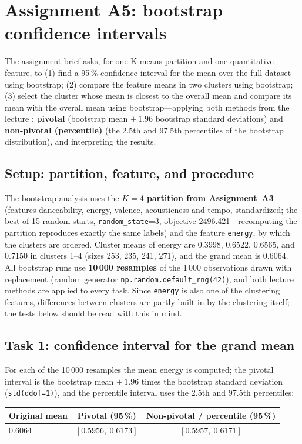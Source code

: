 \documentclass[11pt,letterpaper]{article}
\begin{document}
\section{Assignment A5: bootstrap confidence intervals}\label{sec:a5}

The assignment brief asks, for one K-means partition and one quantitative
feature, to (1) find a 95\,\% confidence interval for the mean over the full
dataset using bootstrap; (2) compare the feature means in two clusters using
bootstrap; (3) select the cluster whose mean is closest to the overall mean
and compare its mean with the overall mean using bootstrap---applying both
methods from the lecture \citep{efron,course}: \textbf{pivotal} (bootstrap
mean $\pm\,1.96$ bootstrap standard deviations) and \textbf{non-pivotal
(percentile)} (the 2.5th and 97.5th percentiles of the bootstrap
distribution), and interpreting the results.

\subsection{Setup: partition, feature, and procedure}\label{sec:a5setup}

The bootstrap analysis uses the \textbf{$K=4$ partition from Assignment~A3}
(features danceability, energy, valence, acousticness and tempo,
standardized; the best of 15 random starts, \texttt{random\_state}=3,
objective 2496.421---recomputing the partition reproduces exactly the same
labels) and the feature \texttt{energy}, by which the clusters are ordered.
Cluster means of energy are 0.3998, 0.6522, 0.6565, and 0.7150 in clusters
1--4 (sizes 253, 235, 241, 271), and the grand mean is 0.6064. All bootstrap
runs use \textbf{10\,000 resamples} of the 1\,000 observations drawn with
replacement (random generator \texttt{np.random.default\_rng(42)}), and both
lecture methods are applied to every task. Since \texttt{energy} is also one
of the clustering features, differences between clusters are partly built in
by the clustering itself; the tests below should be read with this in mind.

\subsection{Task 1: confidence interval for the grand mean}\label{sec:a5t1}

For each of the 10\,000 resamples the mean energy is computed; the pivotal
interval is the bootstrap mean $\pm\,1.96$ times the bootstrap standard
deviation (\texttt{std(ddof=1)}), and the percentile interval uses the 2.5th
and 97.5th percentiles:
\begin{center}
\small
\begin{tabular}{lcc}
\toprule
Original mean & Pivotal (95\,\%) & Non-pivotal / percentile (95\,\%) \\
\midrule
0.6064 & $[0.5956,\ 0.6173]$ & $[0.5957,\ 0.6171]$ \\
\bottomrule
\end{tabular}
\end{center}
\end{document}
